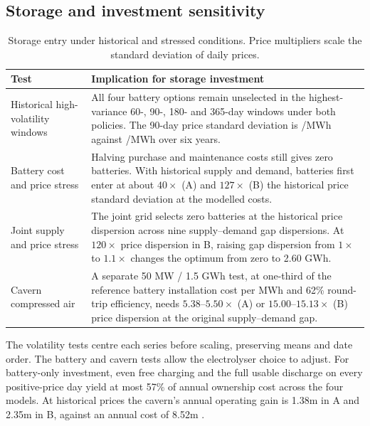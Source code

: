 \subsection{Storage and investment sensitivity}\label{sec:storage1}
\begin{table}[H]
\centering\small
\caption{Storage entry under historical and stressed conditions.
Price multipliers scale the standard deviation of daily prices.}
\label{tab:storage}
\begin{tabularx}{\linewidth}{@{}P{.35\linewidth}Y@{}}
\toprule
Test & Implication for storage investment \\
\midrule
Historical high-volatility windows &
All four battery options remain unselected in the highest-variance
60-, 90-, 180- and 365-day windows under both policies. The 90-day price
standard deviation is /MWh against /MWh over six years. \\
Battery cost and price stress &
Halving purchase and maintenance costs still gives zero batteries.
With historical supply and demand, batteries first enter at about
\(40\times\) (A) and \(127\times\) (B) the historical price standard
deviation at the modelled costs. \\
Joint supply and price stress &
The joint grid selects zero batteries at the historical price dispersion
across nine supply--demand gap dispersions. At \(120\times\) price
dispersion in B, raising gap dispersion from \(1\times\) to \(1.1\times\)
changes the optimum from zero to 2.60 GWh. \\
Cavern compressed air &
A separate 50 MW / 1.5 GWh test, at one-third of the reference battery
installation cost per MWh and 62\% round-trip efficiency, needs
\(5.38\)--\(5.50\times\) (A) or \(15.00\)--\(15.13\times\) (B) price
dispersion at the original supply--demand gap. \\
\bottomrule
\end{tabularx}
\end{table}
The volatility tests centre each series before scaling, preserving
means and date order. The battery and cavern tests allow the electrolyser
choice to adjust. For battery-only investment, even free charging and
the full usable discharge on every positive-price day yield at most
57\% of annual ownership cost across the four models. At historical
prices the cavern's annual operating
gain is \gbp 1.38m in A and \gbp 2.35m in B, against an annual cost of
\gbp 8.52m \cite{stress}.

